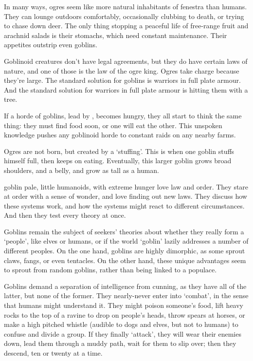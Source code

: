 \begin{multicols}{2}

\noindent
In many ways, \glspl{ogre} seem like more natural inhabitants of \gls{fenestra} than humans.
They can lounge outdoors comfortably, occasionally clubbing  to death, or trying to chase down deer.
The only thing stopping a peaceful life of free-range fruit and arachnid salads is their stomachs, which need constant maintenance.
Their appetites outstrip even goblins.

Goblinoid creatures don't have legal agreements, but they do have certain laws of nature, and one of those is the law of the \gls{ogre} king.
Ogres take charge because they're large.
The standard solution for goblins is warriors in full plate armour.
And the standard solution for warriors in full plate armour is  hitting them with a tree.

If a horde of goblins, lead by , becomes hungry, they all start to think the same thing: they must find food soon, or one will eat the other.
This unspoken knowledge pushes any goblinoid horde to constant raids on any nearby farms.

Ogres are not born, but created by a `stuffing'.
This is when one goblin stuffs himself full, then keeps on eating.
Eventually, this larger goblin grows broad shoulders, and a belly, and grow as tall as a human.

  {goblin}%
  {pale, little humanoids, with extreme hunger}%
love law and order.
They stare at order with a sense of wonder, and love finding out new laws.
They discuss how these systems work, and how the systems might react to different circumstances.
And then they test every theory at once.

Goblins remain the subject of \glspl{seeker}' theories about whether they really form a `people', like elves or humans, or if the world `goblin' lazily addresses a number of different peoples.
On the one hand, goblins are highly dimorphic, as some sprout claws, fangs, or even tentacles.
On the other hand, these unique advantages seem to sprout from random goblins, rather than being linked to a populace.

Goblins demand a separation of intelligence from cunning, as they have all of the latter, but none of the former.
They nearly-never enter into `combat', in the sense that humans might understand it.
They might poison someone's food, lift heavy rocks to the top of a ravine to drop on people's heads, throw spears at horses, or make a high pitched whistle (audible to dogs and elves, but not to humans) to confuse and divide a group.
If they finally `attack', they will wear their enemies down, lead them through a muddy path, wait for them to slip over; then they descend, ten or twenty at a time.


\end{multicols}
